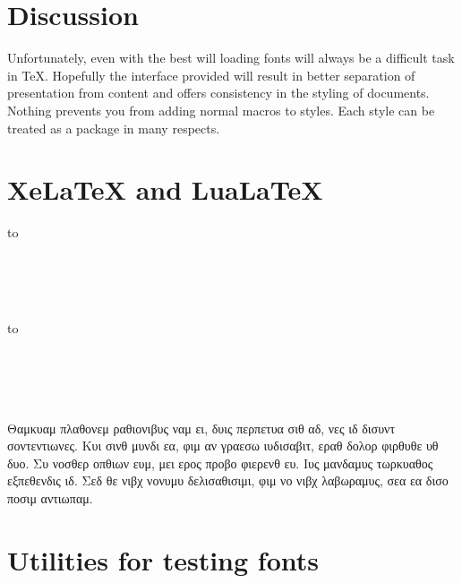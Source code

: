 \section{Discussion}


Unfortunately, even with the best will loading fonts will always be a difficult task in TeX. Hopefully the interface provided will result in better separation of presentation from content and offers consistency in the styling of documents. Nothing prevents you from adding normal macros to styles. Each style can be treated as a package in many respects.



\section{XeLaTeX and LuaLaTeX}


\bgroup
{}
\begin{minipage}[t]{.2\linewidth}
\hbox to 
\end{minipage}
\begin{minipage}[t]{.75\linewidth}
^^A
\noindent\fox\\
\alphabet\\
\punctuation\\
\frogking
\end{minipage}
\egroup

\bgroup
{}
\begin{minipage}[t]{.2\linewidth}
\hbox to 
\end{minipage}
\begin{minipage}[t]{.65\linewidth}
^^A
\noindent\fox\\
\alphabet\\
\textsc{\alphabet}\\
\punctuation\\
\frogking
Θαμκυαμ πλαθονεμ ραθιονιβυς ναμ ει, δυις περπετυα σιθ αδ, νες ιδ δισυντ σοντεντιωνες. Κυι σινθ μυνδι εα, φιμ αν γραεσω ιυδισαβιτ, εραθ δολορ φιρθυθε υθ δυο. Συ νοσθερ οπθιων ευμ, μει ερος προβο φιερενθ ευ. Ιυς μανδαμυς τωρκυαθος εξπεθενδις ιδ. Σεδ θε νιβχ νονυμυ δελισαθισιμι, φιμ νο νιβχ λαβωραμυς, σεα εα δισο ποσιμ αντιωπαμ.
\end{minipage}
\egroup

\section{Utilities for testing fonts}

